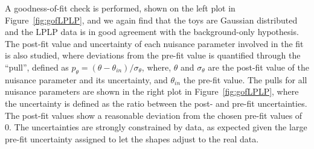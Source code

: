 A goodness-of-fit check is performed, shown on the left plot in Figure~\ref{fig:gofLPLP}, and we again find that the toys are Gaussian distributed and the LPLP data is in good agreement with the background-only hypothesis. The post-fit value and uncertainty of each nuisance parameter involved in the fit is also studied, where deviations from the pre-fit value is quantified through the ``pull'', defined as $p_{\theta} = (\theta - \theta_{in})/\sigma_\theta$, where, $\theta$ and $\sigma_\theta$ are the post-fit value of the nuisance parameter and its uncertainty, and $\theta_{in}$ the pre-fit value. The pulls for all nuisance parameters are shown in the right plot in Figure~\ref{fig:gofLPLP}, where the uncertainty is defined as the ratio between the post- and pre-fit uncertainties. The post-fit values show a reasonable deviation from the chosen pre-fit values of 0. The uncertainties are strongly constrained by data, as expected given the large pre-fit uncertainty assigned to let the shapes adjust to the real data.
